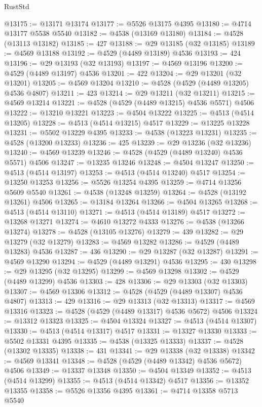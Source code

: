 \begin{lexlean}{RustStd}
\begin{coremodule}
@13175 := @13171 @13174
@13177 := @5526 @13175 @4395
@13180 := @4714 @13177 @5538 @5540
@13182 := @4538 (@13169 @13180)
@13184 := @4528 (@13113 @13182)
@13185 := 427
@13188 := @29 @13185 (@32 @13185)
@13189 := @4569 @13188
@13192 := @4529 (@4489 @13189) @4536
@13193 := 424
@13196 := @29 @13193 (@32 @13193)
@13197 := @4569 @13196
@13200 := @4529 (@4489 @13197) @4536
@13201 := 422
@13204 := @29 @13201 (@32 @13201)
@13205 := @4569 @13204
@13210 := @4528 (@4529 (@4489 @13205) @4536 @4807)
@13211 := 423
@13214 := @29 @13211 (@32 @13211)
@13215 := @4569 @13214
@13221 := @4528 (@4529 (@4489 @13215) @4536 @5571) @4506
@13222 := @13210 @13221
@13223 := @4504 @13222
@13225 := @4513 (@4514 @13205)
@13228 := @4513 (@4514 @13215) @4517
@13229 := @13225 @13228
@13231 := @5502 @13229 @4395
@13233 := @4538 (@13223 @13231)
@13235 := @4528 (@13200 @13233)
@13236 := 425
@13239 := @29 @13236 (@32 @13236)
@13240 := @4569 @13239
@13246 := @4528 (@4529 (@4489 @13240) @4536 @5571) @4506
@13247 := @13235 @13246
@13248 := @4504 @13247
@13250 := @4513 (@4514 @13197)
@13253 := @4513 (@4514 @13240) @4517
@13254 := @13250 @13253
@13256 := @5526 @13254 @4395
@13259 := @4714 @13256 @5609 @5540
@13261 := @4538 (@13248 @13259)
@13264 := @4528 (@13192 @13261) @4506
@13265 := @13184 @13264
@13266 := @4504 @13265
@13268 := @4513 (@4514 @13110)
@13271 := @4513 (@4514 @13189) @4517
@13272 := @13268 @13271
@13274 := @4610 @13272 @4333
@13276 := @4538 (@13266 @13274)
@13278 := @4528 (@13105 @13276)
@13279 := 439
@13282 := @29 @13279 (@32 @13279)
@13283 := @4569 @13282
@13286 := @4529 (@4489 @13283) @4536
@13287 := 436
@13290 := @29 @13287 (@32 @13287)
@13291 := @4569 @13290
@13294 := @4529 (@4489 @13291) @4536
@13295 := 430
@13298 := @29 @13295 (@32 @13295)
@13299 := @4569 @13298
@13302 := @4529 (@4489 @13299) @4536
@13303 := 428
@13306 := @29 @13303 (@32 @13303)
@13307 := @4569 @13306
@13312 := @4528 (@4529 (@4489 @13307) @4536 @4807)
@13313 := 429
@13316 := @29 @13313 (@32 @13313)
@13317 := @4569 @13316
@13323 := @4528 (@4529 (@4489 @13317) @4536 @5672) @4506
@13324 := @13312 @13323
@13325 := @4504 @13324
@13327 := @4513 (@4514 @13307)
@13330 := @4513 (@4514 @13317) @4517
@13331 := @13327 @13330
@13333 := @5502 @13331 @4395
@13335 := @4538 (@13325 @13333)
@13337 := @4528 (@13302 @13335)
@13338 := 431
@13341 := @29 @13338 (@32 @13338)
@13342 := @4569 @13341
@13348 := @4528 (@4529 (@4489 @13342) @4536 @5672) @4506
@13349 := @13337 @13348
@13350 := @4504 @13349
@13352 := @4513 (@4514 @13299)
@13355 := @4513 (@4514 @13342) @4517
@13356 := @13352 @13355
@13358 := @5526 @13356 @4395
@13361 := @4714 @13358 @5713 @5540

\end{coremodule}
\end{lexlean}
